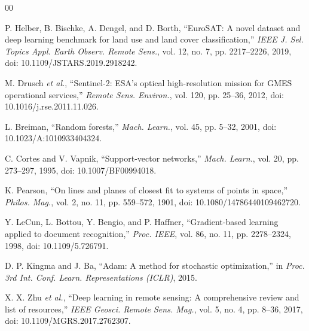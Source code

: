 \documentclass[conference]{IEEEtran}
\begin{document}
\balance
\begin{thebibliography}{00}

P. Helber, B. Bischke, A. Dengel, and D. Borth, ``EuroSAT: A novel dataset and
deep learning benchmark for land use and land cover classification,''
\emph{IEEE J. Sel. Topics Appl. Earth Observ. Remote Sens.}, vol. 12, no. 7,
pp. 2217--2226, 2019, doi: 10.1109/JSTARS.2019.2918242.

M. Drusch \emph{et al.}, ``Sentinel-2: ESA's optical high-resolution mission
for GMES operational services,'' \emph{Remote Sens. Environ.}, vol. 120,
pp. 25--36, 2012, doi: 10.1016/j.rse.2011.11.026.

L. Breiman, ``Random forests,'' \emph{Mach. Learn.}, vol. 45, pp. 5--32, 2001,
doi: 10.1023/A:1010933404324.

C. Cortes and V. Vapnik, ``Support-vector networks,'' \emph{Mach. Learn.},
vol. 20, pp. 273--297, 1995, doi: 10.1007/BF00994018.

K. Pearson, ``On lines and planes of closest fit to systems of points in
space,'' \emph{Philos. Mag.}, vol. 2, no. 11, pp. 559--572, 1901,
doi: 10.1080/14786440109462720.

Y. LeCun, L. Bottou, Y. Bengio, and P. Haffner, ``Gradient-based learning
applied to document recognition,'' \emph{Proc. IEEE}, vol. 86, no. 11,
pp. 2278--2324, 1998, doi: 10.1109/5.726791.

D. P. Kingma and J. Ba, ``Adam: A method for stochastic optimization,'' in
\emph{Proc. 3rd Int. Conf. Learn. Representations (ICLR)}, 2015.

X. X. Zhu \emph{et al.}, ``Deep learning in remote sensing: A comprehensive
review and list of resources,'' \emph{IEEE Geosci. Remote Sens. Mag.}, vol. 5,
no. 4, pp. 8--36, 2017, doi: 10.1109/MGRS.2017.2762307.

\end{thebibliography}
\end{document}
